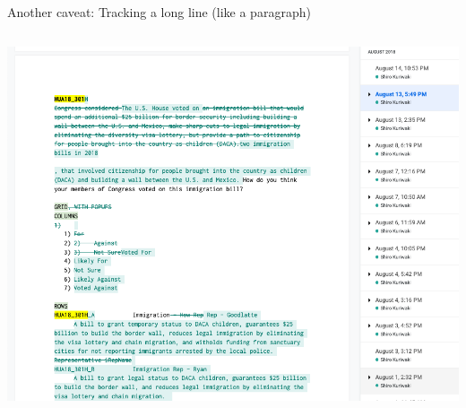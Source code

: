 \documentclass[ignorenonframetext,notes, 10pt, aspectratio=169]{beamer}
\begin{document}
\begin{frame}{Another caveat: Tracking a long line (like a paragraph)}
\begin{columns}[T]
\begin{column}{0.6\textwidth}
\begin{overprint}
\includegraphics[width = \linewidth]{googledoc-diff.png}
\end{overprint}
\end{column}
\end{columns}
\end{frame}
\end{document}

